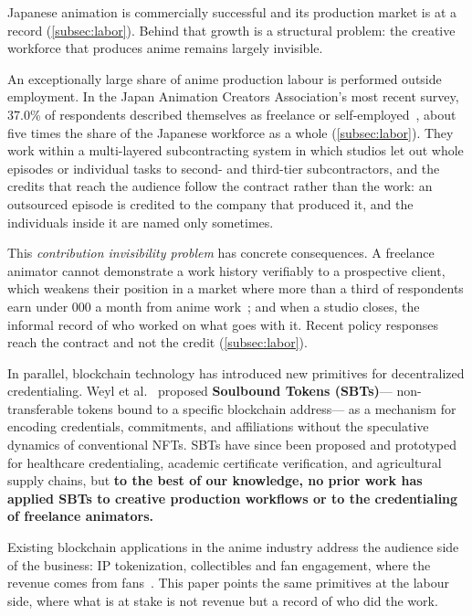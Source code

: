 
Japanese animation is commercially successful and its production market is at a
record (\cref{subsec:labor}). Behind that growth is a structural problem:
the creative workforce that produces anime remains largely invisible.

An exceptionally large share of anime production labour is performed outside
employment. In the Japan Animation Creators Association's most recent survey, 37.0\% of
respondents described themselves as freelance or self-employed~\cite{janica2026survey},
about five times the share of the Japanese workforce as a whole
(\cref{subsec:labor}). They work within a multi-layered subcontracting system in which
studios let out whole episodes or individual tasks to second- and third-tier
subcontractors, and the credits that reach the audience follow the contract rather than
the work: an outsourced episode is credited to the company that produced it, and the
individuals inside it are named only sometimes.

This \textit{contribution invisibility problem} has concrete consequences. A freelance
animator cannot demonstrate a work history verifiably to a prospective client, which
weakens their position in a market where more than a third of respondents earn under
000 a month from anime work~\cite{nafca2024survey}; and when a studio
closes, the informal record of who worked on what goes with it. Recent policy responses
reach the contract and not the credit (\cref{subsec:labor}).

In parallel, blockchain technology has introduced new primitives
for decentralized credentialing.
Weyl et al.~\cite{buterin2022decentralized} proposed \textbf{Soulbound Tokens (SBTs)}---
non-transferable tokens bound to a specific blockchain address---
as a mechanism for encoding credentials, commitments, and affiliations
without the speculative dynamics of conventional NFTs.
SBTs have since been proposed and prototyped for healthcare credentialing,
academic certificate verification, and agricultural supply chains,
but \textbf{to the best of our knowledge, no prior work has applied SBTs
to creative production workflows or to the credentialing of freelance animators.}

Existing blockchain applications in the anime industry address the audience side of the
business: IP tokenization, collectibles and fan engagement, where the revenue comes
from fans~\cite{fourpillars2025anime,animechain2024whitepaper}. This paper points the
same primitives at the labour side, where what is at stake is not revenue but a record
of who did the work.

